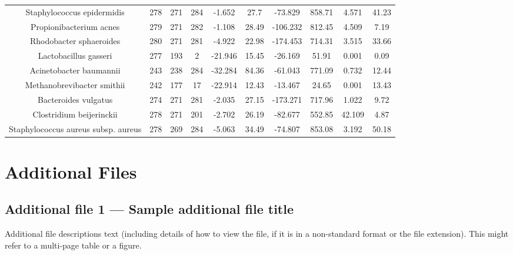 \documentclass[10pt]{bmc_article}
\newenvironment{bmcformat}{\begin{raggedright}\baselineskip20pt\sloppy\setboolean{publ}{false}}{\end{raggedright}\baselineskip20pt\sloppy}
\begin{document}
\begin{bmcformat}
\begin{landscape}
{\begin{tabular}{|c|c|c|c|c|c|c|c|c|c|}
        Staphylococcus epidermidis & 278 & 271 & 284 & -1.652 & 27.7 & -73.829 & 858.71 & 4.571 & 41.23 \\
        Propionibacterium acnes & 279 & 271 & 282 & -1.108 & 28.49 & -106.232 & 812.45 & 4.509 & 7.19 \\
        Rhodobacter sphaeroides & 280 & 271 & 281 & -4.922 & 22.98 & -174.453 & 714.31 & 3.515 & 33.66 \\
        Lactobacillus gasseri & 277 & 193 & 2 & -21.946 & 15.45 & -26.169 & 51.91 & 0.001 & 0.09 \\
        Acinetobacter baumannii & 243 & 238 & 284 & -32.284 & 84.36 & -61.043 & 771.09 & 0.732 & 12.44 \\
        Methanobrevibacter smithii & 242 & 177 & 17 & -22.914 & 12.43 & -13.467 & 24.65 & 0.001 & 13.43 \\
        Bacteroides vulgatus & 274 & 271 & 281 & -2.035 & 27.15 & -173.271 & 717.96 & 1.022 & 9.72 \\
        Clostridium beijerinckii & 278 & 271 & 201 & -2.702 & 26.19 & -82.677 & 552.85 & 42.109 & 4.87 \\
        Staphylococcus aureus subsp. aureus & 278 & 269 & 284 & -5.063 & 34.49 & -74.807 & 853.08 & 3.192 & 50.18 \\
        \hline
      \end{tabular}
    }
      \end{landscape}



\section*{Additional Files}
  \subsection*{Additional file 1 --- Sample additional file title}
    Additional file descriptions text (including details of how to
    view the file, if it is in a non-standard format or the file extension).  This might
    refer to a multi-page table or a figure.


\end{bmcformat}
\end{document}
